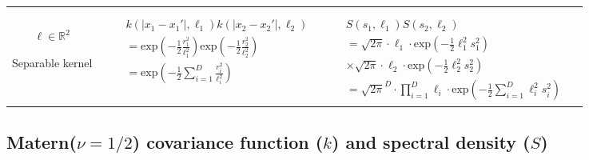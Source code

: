 \documentclass[onecolumn,a4paper,11pt]{article}
\begin{document}
\begin{landscape}
\begin{table}[H]
\begin{center}
\begin{tabular}{|c|c|c|c|}
       & \multicolumn{1}{|p{6.2cm}|}{

       } \\
       \vspace{-10mm}\\
       \cline{1-3}
       
       \multicolumn{1}{|p{1.5cm}|}{
       \vspace{1mm}
       $\bm{\ell} \in \mathbb{R}^2$
       
       {Separable kernel} 
       }
       
        & \multicolumn{1}{|p{7.2cm}|}{
         \begin{eqnarray*}
		&&k(|x_1-x_1'|,\ell_1)k(|x_2-x_2'|,\ell_2) \\
		&&= \mathrm{exp}\left(-\frac{1}{2} \frac{r_1^2}{\ell_1^2} \right) \mathrm{exp}\left(-\frac{1}{2} \frac{r_2^2}{\ell_2^2} \right) \\
		&&= \mathrm{exp}\left(-\frac{1}{2} \sum_{i=1}^{D}\frac{r_i^2}{\ell_i^2} \right)
         \end{eqnarray*}
       }
       
       & \multicolumn{1}{|p{8.2cm}|}{
         \begin{eqnarray*}
		&&S(s_1,\ell_1)S(s_2,\ell_2) \\
		&&= \sqrt{2\pi} \cdot \ell_1 \cdot \mathrm{exp}\left(-\frac{1}{2} \ell_1^2 s_1^2 \right) \\
		&& \times \sqrt{2\pi} \cdot \ell_2 \cdot \mathrm{exp}\left(-\frac{1}{2} \ell_2^2 s_2^2 \right)\\
		&&= \sqrt{2\pi}^D \cdot \prod_{i=1}^D \ell_i \cdot \mathrm{exp}\left(-\frac{1}{2} \sum_{i=1}^D \ell_i^2 s_i^2 \right)
         \end{eqnarray*}
       } 

       & \multicolumn{1}{|p{6.2cm}|}{

       } \\
              
       \hline
       
    \end{tabular}
  \end{center}
\end{table}



\newpage	
\subsection{Matern($\nu=1/2$) covariance function ($k$) \textbf and spectral density ($S$)}
\vspace{-2mm}

\end{landscape}
\end{document}
